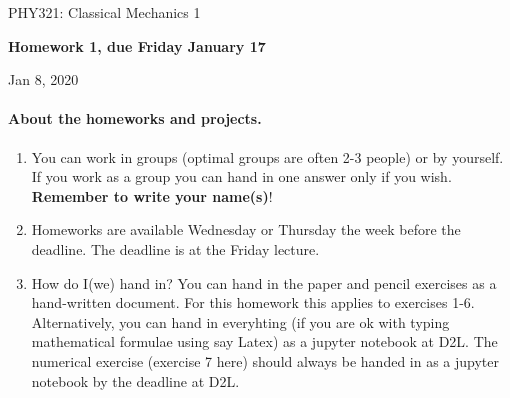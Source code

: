 \documentclass[%
oneside,                 %
final,                   %
10pt]{article}
\begin{document}

\newcommand{\exercisesection}[1]{\subsection*{#1}}






\thispagestyle{empty}

\begin{center}
{\LARGE\bf
\begin{spacing}{1.25}
PHY321: Classical Mechanics 1
\end{spacing}
}
\end{center}


\begin{center}
{\bf Homework 1, due Friday January 17${}^{}$} \\ [0mm]
\end{center}

\begin{center}
\end{center}
    

\begin{center}
Jan 8, 2020
\end{center}

\vspace{1cm}


\paragraph{About the homeworks and projects.}
\begin{enumerate}
\item You can work in groups (optimal groups are often 2-3 people) or by yourself. If you work as a group you can hand in one answer only if you wish. \textbf{Remember to write your name(s)}!

\item Homeworks are available Wednesday or Thursday the week before the deadline. The deadline is at the Friday lecture.

\item How do I(we)  hand in?  You can hand in the paper and pencil exercises as a hand-written document. For this homework this applies to exercises 1-6. Alternatively, you can hand in everyhting (if you are ok with typing mathematical formulae using say Latex) as a jupyter notebook at D2L. The numerical exercise (exercise 7 here) should always be handed in as a jupyter notebook by the deadline at D2L. 
\end{enumerate}
\end{document}

